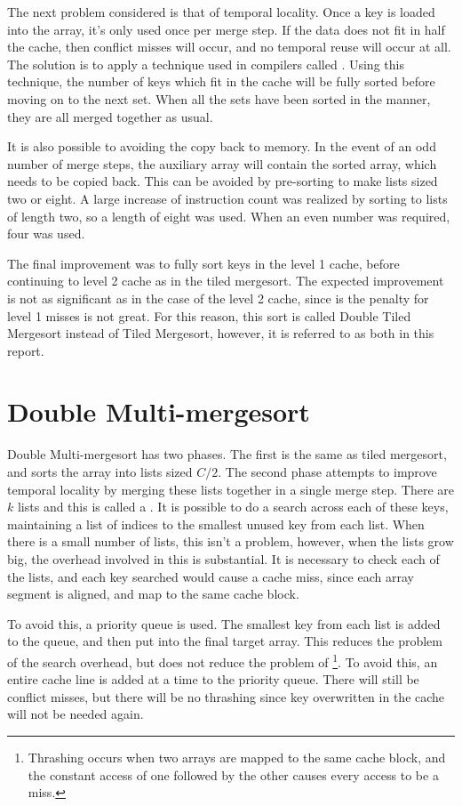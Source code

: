 The next problem considered is that of temporal locality. Once a key is loaded
into the array, it's only used once per merge step. If the data does not fit in
half the cache, then conflict misses will occur, and no temporal reuse will
occur at all. The solution is to apply a technique used in compilers called
. Using this technique, the number of keys which fit in the cache will
be fully sorted before moving on to the next set. When all the sets have been
sorted in the manner, they are all merged together as usual.

It is also possible to avoiding the copy back to memory. In the event of an odd
number of merge steps, the auxiliary array will contain the sorted array, which
needs to be copied back. This can be avoided by pre-sorting to make lists sized
two or eight. A large increase of instruction count was realized by sorting to
lists of length two, so a length of eight was used. When an even number was
required, four was used.

The final improvement was to fully sort keys in the level 1 cache, before
continuing to level 2 cache as in the tiled mergesort. The expected improvement
is not as significant as in the case of the level 2 cache, since is the penalty
for level 1 misses is not great. For this reason, this sort is called Double
Tiled Mergesort instead of Tiled Mergesort, however, it is referred to as both
in this report.

\section{Double Multi-mergesort}

Double Multi-mergesort has two phases. The first is the same as tiled mergesort, and
sorts the array into lists sized $C/2$. The second phase attempts to improve
temporal locality by merging these lists together in a single merge step. There
are $k$ lists and this is called a . It is possible to do a
search across each of these keys, maintaining a list of indices to the smallest
unused key from each list. When there is a small number of lists, this isn't a
problem, however, when the lists grow big, the overhead involved in this is
substantial. It is necessary to check each of the lists, and each key searched
would cause a cache miss, since each array segment is aligned, and map to
the same cache block.

To avoid this, a priority queue is used. The smallest key from each list is
added to the queue, and then put into the final target array. This reduces the
problem of the search overhead, but does not reduce the problem of
\footnote{Thrashing occurs when two arrays are mapped to the same
cache block, and the constant access of one followed by the other causes every
access to be a miss.}.  To avoid this, an entire cache line is added at a time
to the priority queue. There will still be conflict misses, but there will be no
thrashing since key overwritten in the cache will not be needed again.

